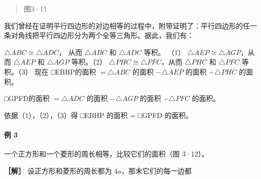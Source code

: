 \begin{quote}
图3·11
\end{quote}

我们曾经在证明平行四边形的对边相等的过程中，附带证明了：平行四边形的任一条对角线把平行四边形分为两个全等三角形。据此，我们有：

\(\triangle ABC \cong \triangle ADC\)， 从而 \(\triangle ABC\) 和
\(\triangle ADC\) 等积。 （1）
\(\triangle AEP \cong \triangle AGP\)，从而 \(\triangle AEP\) 和
\(\triangle AGP\) 等积。（2）
\(\triangle PHC \cong \triangle PFC\)，从而 \(\triangle PHC\) 和
\(\triangle PFC\) 等积。（3） 现在 □EBHP的面积 \(= \triangle ABC\)
的面积 \(-\triangle AEP\) 的面积 \(-\triangle PHC\) 的面积。

□GPFD的面积 \(= \triangle ADC\) 的面积 \(-\triangle AGP\) 的面积
\(-\triangle PFC\) 的面积。

依据（1），（2），（3）得 □EBHP 的面积 = □GPFD 的面积。

\paragraph{例 3}

一个正方形和一个菱形的周长相等，比较它们的面积（图 3·12）。

\textbf{［解］} 设正方形和菱形的周长都为 \(4a\)，那末它们的每一边都

